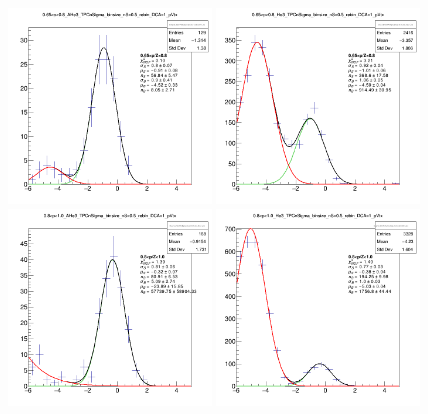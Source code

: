 \begin{figure}
    \centering
    \includegraphics[width=0.48\textwidth]{figures/Selected_Plots/0.65<p<0.8_AHe3_TPCnSigma_binsize_nS=0.5_rebin_DCA=1_pVtx.png}
    \includegraphics[width=0.48\textwidth]{figures/Selected_Plots/0.65<p<0.8_He3_TPCnSigma_binsize_nS=0.5_rebin_DCA=1_pVtx.png}
    \includegraphics[width=0.48\textwidth]{figures/Selected_Plots/0.8<p<1.0_AHe3_TPCnSigma_binsize_nS=0.5_rebin_DCA=1_pVtx.png}
    \includegraphics[width=0.48\textwidth]{figures/Selected_Plots/0.8<p<1.0_He3_TPCnSigma_binsize_nS=0.5_rebin_DCA=1_pVtx.png}

\end{figure}
